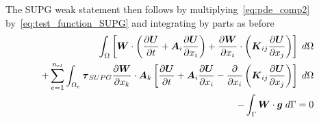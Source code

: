 The SUPG weak statement then follows by multiplying~\eqref{eq:pde_comp2} by~\eqref{eq:test_function_SUPG} and integrating by parts as before
\begin{eqnarray}
  \label{eq:comp_weak_SUPG}
  \int_\Omega  \left[ \bv{W}\cdot\left(\pdv{\bv{U}}{t} + \bt{A}_i \pdv{\bv{U}}{x_i} \right) + \pdv{\bv{W}}{x_i} \cdot \left( \bt{K}_{ij} \pdv{\bv{U}}{x_j} \right) \right] \dx \nonumber \\
  + \sum_{e=1}^{n_{el}} \int_{\Omega_e} \bt{\tau}_{SUPG} \pdv{\bv{W}}{x_k}\cdot\bt{A}_k
  \left[ \pdv{\bv{U}}{t} + \bt{A}_i \pdv{\bv{U}}{x_i} - \pdv{}{x_i} \left( \bt{K}_{ij} \pdv{\bv{U}}{x_j} \right) \right] \dx  \nonumber \\
  -\int_\Gamma \bv{W}\cdot\bv{g} \ds = 0
\end{eqnarray}


